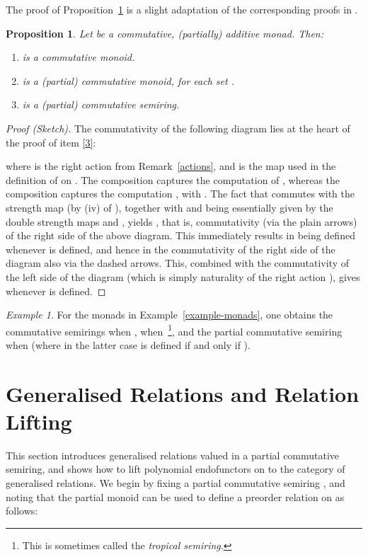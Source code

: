 \documentclass[submission,copyright,creativecommons]{eptcs}
\theoremstyle{plain}\newtheorem{theorem}{Theorem}[section]
\newtheorem{proposition}[theorem]{Proposition}
\theoremstyle{remark}
\newtheorem{example}[remark]{Example}
\begin{document}
The proof of Proposition~\ref{prop-partial} is a slight adaptation of the corresponding proofs in \cite[Section~5.2]{CoumansJ2011}.
\begin{proposition}
\label{prop-partial}
Let  be a commutative, (partially) additive monad. Then:
\begin{enumerate}
\item  is a commutative monoid.
\item  is a (partial) commutative monoid, for each set .
\item\label{3}   is a (partial) commutative semiring. 
\end{enumerate}
\end{proposition}
\begin{proof}[Proof (Sketch)]
The commutativity of the following diagram lies at the heart of the proof of item \ref{3}:
 
 where  is the right action from Remark~\ref{actions}, and  is the map  used in the definition of  on . The composition  captures the computation of , whereas the composition  captures the computation , with . The fact that  commutes with the strength map (by (iv) of \cite[Lemma~15]{CoumansJ2011}), together with  and  being essentially given by the double strength maps  and , yields , that is, commutativity (via the plain arrows) of the right side of the above diagram. This immediately results in  being defined whenever  is defined, and hence in the commutativity of the right side of the diagram also via the dashed arrows. This, combined with the commutativity of the left side of the diagram (which is simply naturality of the right action ), gives   whenever  is defined.
\end{proof}
\begin{example}
\label{example-semirings}
For the monads in Example~\ref{example-monads}, one obtains the commutative semirings  when {},  when {}\,\footnote{This is sometimes called the \emph{tropical semiring}.}, and the partial commutative semiring  when  (where in the latter case  is defined if and only if ).
\end{example}

\section{Generalised Relations and Relation Lifting}
\label{gen-rel-lifting}

This section introduces generalised relations valued in a partial commutative semiring, and shows how to lift polynomial endofunctors on  to the category of generalised relations. We begin by fixing a partial commutative semiring , and noting that the partial monoid  can be used to define a preorder relation on  as follows:
\end{document}
